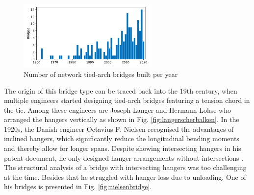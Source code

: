 \begin{figure}[H]
    \centering
    \includegraphics[trim={0 2.2cm 0 1.8cm},clip, width=0.61\textwidth]{overleaf/Pictures/myplot.png}
    \caption{Number of network tied-arch bridges built per year \cite{Cavegn}}
    \label{fig:yearly_bridges}
\end{figure}

The origin of this bridge type can be traced back into the 19th century, when multiple engineers started designing tied-arch bridges featuring a tension chord in the tie. Among these engineers are Joseph Langer and Hermann Lohse who arranged the hangers vertically as shown in Fig. \ref{fig:langerscherbalken}. In the 1920s, the Danish engineer Octavius F. Nielsen recognised the advantages of inclined hangers, which significantly reduce the longitudinal bending moments and thereby allow for longer spans. Despite showing intersecting hangers in his patent document, he only designed hanger arrangements without intersections \cite{Tveit}. The structural analysis of a bridge with intersecting hangers was too challenging at the time. Besides that he struggled with hanger loss due to unloading. One of his bridges is presented in Fig. \ref{fig:nielsenbridge}.

